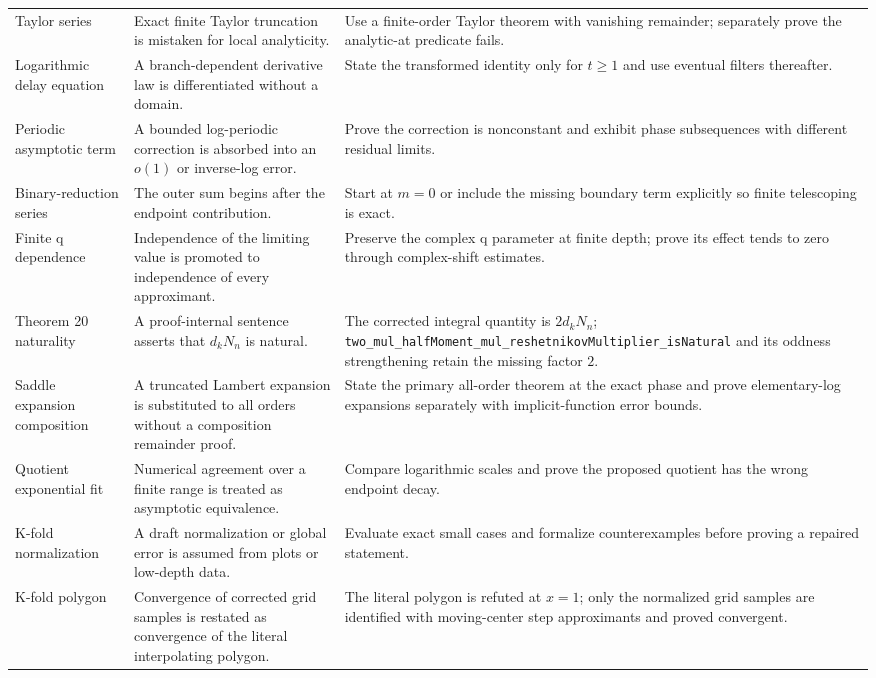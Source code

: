 \documentclass[11pt,oneside]{article}
\theoremstyle{definition}
\theoremstyle{remark}
\begin{document}
\begin{longtable}{@{}>{\raggedright\arraybackslash}p{} >{\raggedright\arraybackslash}p{} >{\raggedright\arraybackslash}p{}@{}}
Taylor series & Exact finite Taylor truncation is mistaken for local analyticity. & Use a finite-order Taylor theorem with vanishing remainder; separately prove the analytic-at predicate fails. \\
Logarithmic delay equation & A branch-dependent derivative law is differentiated without a domain. & State the transformed identity only for \(t\geq1\) and use eventual filters thereafter. \\
Periodic asymptotic term & A bounded log-periodic correction is absorbed into an \(o(1)\) or inverse-log error. & Prove the correction is nonconstant and exhibit phase subsequences with different residual limits. \\
Binary-reduction series & The outer sum begins after the endpoint contribution. & Start at \(m=0\) or include the missing boundary term explicitly so finite telescoping is exact. \\
Finite q dependence & Independence of the limiting value is promoted to independence of every approximant. & Preserve the complex q parameter at finite depth; prove its effect tends to zero through complex-shift estimates. \\
Theorem 20 naturality & A proof-internal sentence asserts that \(d_kN_n\) is natural. & The corrected integral quantity is \(2d_kN_n\); \nolinkurl{two_mul_halfMoment_mul_reshetnikovMultiplier_isNatural} and its oddness strengthening retain the missing factor \(2\). \\
Saddle expansion composition & A truncated Lambert expansion is substituted to all orders without a composition remainder proof. & State the primary all-order theorem at the exact phase and prove elementary-log expansions separately with implicit-function error bounds. \\
Quotient exponential fit & Numerical agreement over a finite range is treated as asymptotic equivalence. & Compare logarithmic scales and prove the proposed quotient has the wrong endpoint decay. \\
K-fold normalization & A draft normalization or global error is assumed from plots or low-depth data. & Evaluate exact small cases and formalize counterexamples before proving a repaired statement. \\
K-fold polygon & Convergence of corrected grid samples is restated as convergence of the literal interpolating polygon. & The literal polygon is refuted at \(x=1\); only the normalized grid samples are identified with moving-center step approximants and proved convergent. \\

\end{longtable}
\end{document}
